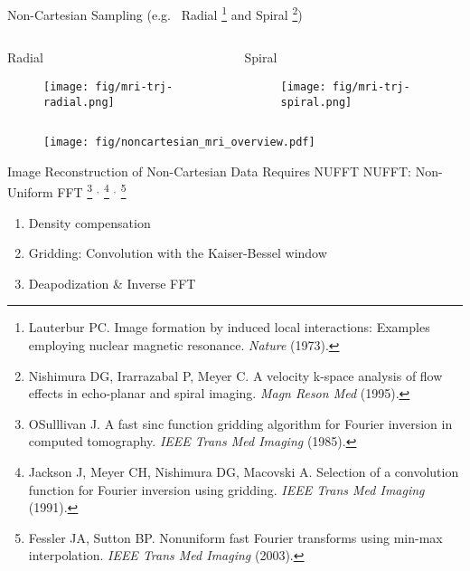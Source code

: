 \begin{frame}{Non-Cartesian Sampling (e.g.~ Radial \footnote{Lauterbur PC. Image formation by induced local interactions: Examples employing nuclear magnetic resonance. \textit{Nature} (1973).} and Spiral \footnote{Nishimura DG, Irarrazabal P, Meyer C. A velocity k-space analysis of flow effects in echo-planar and spiral imaging. \textit{Magn Reson Med} (1995).})}

    \begin{columns}
		\begin{column}{0.35\textwidth}
			\centering
			Radial
			\begin{figure}
				\texttt{[image: fig/mri-trj-radial.png]}
			\end{figure}
		\end{column}

		\begin{column}{0.35\textwidth}
			\centering
			Spiral
			\begin{figure}
				\texttt{[image: fig/mri-trj-spiral.png]}
			\end{figure}
		\end{column}
	\end{columns}
\end{frame}


\begin{frame}
    \begin{figure}
        \centering
        \texttt{[image: fig/noncartesian\_mri\_overview.pdf]}
    \end{figure}
\end{frame}


\begin{frame}{Image Reconstruction of Non-Cartesian Data Requires NUFFT}
	NUFFT: Non-Uniform FFT \footnote{OSulllivan J. A fast sinc function gridding algorithm for Fourier inversion in computed tomography. \textit{IEEE Trans Med Imaging} (1985).}
	$^,$ \footnote{Jackson J, Meyer CH, Nishimura DG, Macovski A. Selection of a convolution function for Fourier inversion using gridding. \textit{IEEE Trans Med Imaging} (1991).}
	$^,$ \footnote{Fessler JA, Sutton BP. Nonuniform fast Fourier transforms using min-max interpolation. \textit{IEEE Trans Med Imaging} (2003).}
    \vspace{1em}
	\begin{enumerate}
		\item Density compensation
		\item Gridding: Convolution with the Kaiser-Bessel window
		\item Deapodization \& Inverse FFT
	\end{enumerate}
\end{frame}


